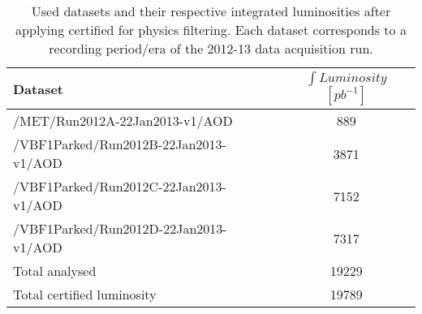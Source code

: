 \begin{table}[htp]
\centering

\begin{tabular}{|l|c|}
\hline
Dataset & $\int{Luminosity}$ $[pb^{-1}]$ \\
\hline \hline
/MET/Run2012A-22Jan2013-v1/AOD        & 889 \\
/VBF1Parked/Run2012B-22Jan2013-v1/AOD & 3871 \\
/VBF1Parked/Run2012C-22Jan2013-v1/AOD & 7152 \\
/VBF1Parked/Run2012D-22Jan2013-v1/AOD & 7317 \\
\hline
Total analysed & 19229 \\
\hline \hline
Total certified luminosity & 19789 \\
\hline
\end{tabular}

\caption{Used datasets and their respective integrated luminosities after applying certified for physics filtering. Each dataset corresponds to a recording period/era of the 2012-13 data acquisition run.}
\end{table}